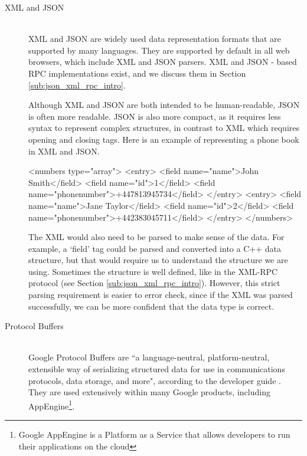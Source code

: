 \begin{description}
	\item[XML and JSON] 
	~\\
	XML and JSON are widely used data representation formats that are supported by many languages. They are supported by default in all web browsers, which include XML and JSON parsers. XML and JSON - based RPC implementations exist, and we discuss them in Section \ref{sub:json_xml_rpc_intro}.

	Although XML and JSON are both intended to be human-readable, JSON is often more readable. JSON is also more compact, as it requires less syntax to represent complex structures, in contrast to XML which requires opening and closing tags. Here is an example of representing a phone book in XML and JSON.

	\begin{code}
	\end{code}
	\begin{code}
<numbers type="array">
    <entry>
    	<field name="name">John Smith</field>
    	<field name="id">1</field>
    	<field name="phonenumber">+447813945734</field>
    </entry>
    <entry>
    	<field name="name">Jane Taylor</field>
    	<field name="id">2</field>
    	<field name="phonenumber">+442383045711</field>
    </entry>
</numbers>
	\end{code}

	The XML would also need to be parsed to make sense of the data. For example, a `field' tag could be parsed and converted into a C++ data structure, but that would require us to understand the structure we are using. Sometimes the structure is well defined, like in the XML-RPC protocol (see Section \ref{sub:json_xml_rpc_intro}). However, this strict parsing requirement is easier to error check, since if the XML was parsed successfully, we can be more confident that the data type is correct. 

	\item[Protocol Buffers] 
	~\\
	Google Protocol Buffers are ``a language-neutral, platform-neutral, extensible way of serializing structured data for use in communications protocols, data storage, and more", according to the developer guide \cite{protobufdev}. They are used extensively within many Google products, including AppEngine\footnote{Google AppEngine is a Platform as a Service that allows developers to run their applications on the cloud}. 


\end{description}
